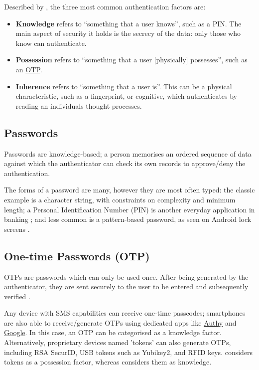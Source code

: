 Described by \cite{surveyOnAuthFactors}, the three most
common authentication factors are: 

\begin{itemize} 

  \item \textbf{Knowledge} \label{p:knowledge} refers to
        \enquote{something that a user knows}, such as a PIN.
        The main aspect of security it holds is the secrecy of the
        data: only those who know can authenticate.

  \item \textbf{Possession} refers to \enquote{something
          that a user [physically] possesses}, such as an
        \hyperref[p:otp]{OTP}.

  \item \textbf{Inherence} refers to \enquote{something
          that a user is}.
        This can be a physical characteristic, such as a
        fingerprint, or cognitive, which authenticates by reading
        an individuals thought processes.
\end{itemize}


\subsection{Passwords}
\label{p:passwords}
Passwords are knowledge-based; a person memorises an
ordered sequence of data against which the authenticator
can check its own records to approve/deny the
authentication.

The forms of a password are many, however they are most
often typed: the classic example is a character string,
with  constraints on complexity and minimum length; a
Personal Identification Number (PIN) is another everyday
application in banking \parencite{whatIsAuth}; and less
common is a pattern-based password, as seen on Android lock
screens \parencite{androidLockScreen}.

\subsection{One-time Passwords (OTP)}
\label{p:otp}
OTPs are passwords which can only be used once.
After being generated by the authenticator, they are sent
securely to the user to be entered and subsequently
verified \parencite{surveyOnAuthFactors}.

Any device with SMS capabilities can receive one-time
passcodes; smartphones are also able to receive/generate
OTPs using dedicated apps like
\href{https://www.twilio.com/authy/features/totp}{Authy}
and \href{https://play.google.com/store/apps/details?
  id=com.google.android.apps.authenticator2}{Google}.
In this case, an OTP can be categorised as a knowledge
factor\parencite{surveyOnAuthFactors, evalOfAuthMethods}.
Alternatively, proprietary devices named 'tokens' can also
generate OTPs, including RSA SecurID, USB tokens such as
Yubikey2, and RFID keys.
\cite{evalOfAuthMethods} considers tokens
as a possession factor, whereas
\cite{surveyOnAuthFactors} considers them as
knowledge.

